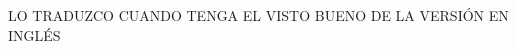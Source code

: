 \documentclass[../main.tex]{subfiles}
\begin{document}
LO TRADUZCO CUANDO TENGA EL VISTO BUENO DE LA VERSIÓN EN INGLÉS %
\end{document}
